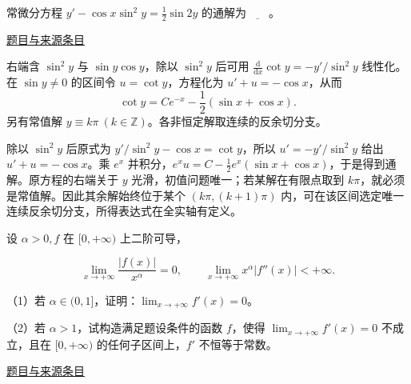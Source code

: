 \documentclass[12pt,fontset=fandol]{ctexart}
\begin{document}
\begin{example}[来源序号4]\label{ex:fin13-high:4}\label{pr:fin13-high:4}

常微分方程 $y' - \cos x \sin^2 y = \frac{1}{2} \sin 2y$ 的通解为$\underline{\qquad}$。

\par\href{https://github.com/lzxcr/cmc-mathematics/blob/64916fa1fdbc3e444a652eca204d5669058ee321/src/problems/finals/13/04.md}{题目与来源条目}

\end{example}

\begin{solve}\label{ans:fin13-high:4}

右端含 $\sin^2y$ 与 $\sin y\cos y$，除以 $\sin^2y$ 后可用 $\frac{\mathrm d}{\mathrm dx}\cot y=-y'/\sin^2y$ 线性化。在 $\sin y\ne0$ 的区间令 $u=\cot y$，方程化为 $u'+u=-\cos x$，从而
\[
\boxed{\cot y=Ce^{-x}-\frac12(\sin x+\cos x)}.
\]
另有常值解 $\boxed{y\equiv k\pi\ (k\in\mathbb Z)}$。各非恒定解取连续的反余切分支。

除以 $\sin^2y$ 后原式为 $y'/\sin^2y-\cos x=\cot y$，所以 $u'=-y'/\sin^2y$ 给出 $u'+u=-\cos x$。乘 $e^x$ 并积分，$e^xu=C-\tfrac12e^x(\sin x+\cos x)$，于是得到通解。原方程的右端关于 $y$ 光滑，初值问题唯一；若某解在有限点取到 $k\pi$，就必须是常值解。因此其余解始终位于某个 $(k\pi,(k+1)\pi)$ 内，可在该区间选定唯一连续反余切分支，所得表达式在全实轴有定义。

\end{solve}

\begin{example}[来源序号7]\label{ex:fin13-high:7}\label{pr:fin13-high:7}

设 $\alpha > 0, f$ 在 $[0,+\infty)$ 上二阶可导，

\[
\lim_{x \rightarrow +\infty} \frac{|f(x)|}{x^\alpha} = 0, \qquad \lim_{x \rightarrow +\infty} x^\alpha |f''(x)| < +\infty.
\]

（1）若 $\alpha \in (0,1]$，证明：$\lim_{x \rightarrow +\infty} f'(x) = 0$。

（2）若 $\alpha > 1$，试构造满足题设条件的函数 $f$，使得 $\lim_{x \rightarrow +\infty} f'(x) = 0$ 不成立，且在 $[0,+\infty)$ 的任何子区间上，$f'$ 不恒等于常数。

\par\href{https://github.com/lzxcr/cmc-mathematics/blob/64916fa1fdbc3e444a652eca204d5669058ee321/src/problems/finals/13/07.md}{题目与来源条目}

\end{example}
\end{document}
